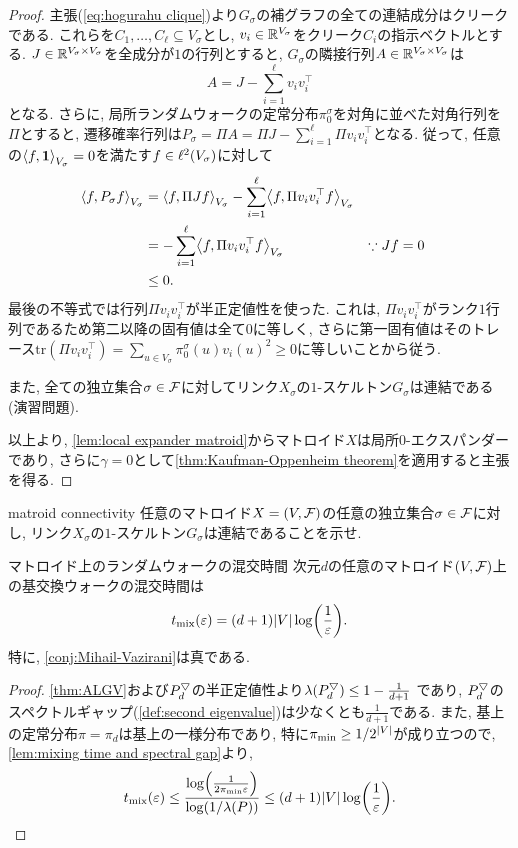 \begin{proof}
    主張(\ref{eq:hogurahu clique})より$G_\sigma$の補グラフの全ての連結成分はクリークである.
    これらを$C_1,\dots,C_\ell \subseteq V_\sigma$とし,
    $v_i\in \Real^{V_\sigma}$をクリーク$C_i$の指示ベクトルとする.
    $J\in\Real^{V_\sigma\times V_\sigma}$を全成分が$1$の行列とすると,
    $G_\sigma$の隣接行列$A\in\Real^{V_\sigma\times V_\sigma}$は
    \[
        A = J - \sum_{i=1}^\ell v_i v_i^\top
    \]
    となる.
    さらに, 局所ランダムウォークの定常分布$\pi^\sigma_0$を対角に並べた対角行列を$\Pi$とすると, 遷移確率行列は$P_\sigma = \Pi A = \Pi J - \sum_{i=1}^\ell \Pi v_iv_i^\top$となる.
    従って, 任意の$\iprod[V_\sigma]{f,\allone}=0$を満たす$f\in \ispace[V_\sigma]$に対して
    \begin{align*}
        \iprod[V_\sigma]{f,P_\sigma f} &= \iprod[V_\sigma]{f,\Pi J f} - \sum_{i=1}^\ell \iprod[V_\sigma]{f,\Pi v_iv_i^\top f} \\
        &= - \sum_{i=1}^\ell \iprod[V_\sigma]{f,\Pi v_iv_i^\top f} & & \text{$\because J f = 0$} \\
        &\le 0.
    \end{align*}
    最後の不等式では行列$\Pi v_iv_i^\top$が半正定値性を使った.
    これは,
    $\Pi v_i v_i^\top$がランク$1$行列であるため第二以降の固有値は全て$0$に等しく,
    さらに第一固有値はそのトレース$\mathrm{tr}(\Pi v_i v_i^\top) = \sum_{u\in V_\sigma} \pi^\sigma_0(u) v_i(u)^2\ge 0$に等しいことから従う.
    
    また, 全ての独立集合$\sigma\in \F$に対してリンク$X_\sigma$の$1$-スケルトン$G_\sigma$は連結である (演習問題).

    以上より, \cref{lem:local expander matroid}からマトロイド$X$は局所$0$-エクスパンダーであり, さらに$\gamma=0$として\cref{thm:Kaufman-Oppenheim theorem}を適用すると主張を得る.
\end{proof}

\begin{exercise}{}{matroid connectivity}
    任意のマトロイド$X = (V,\F)$の任意の独立集合$\sigma \in \F$に対し,
    リンク$X_\sigma$の$1$-スケルトン$G_\sigma$は連結であることを示せ.
\end{exercise}

\begin{corollary}{マトロイド上のランダムウォークの混交時間}{}
    次元$d$の任意のマトロイド$(V,\F)$上の基交換ウォークの混交時間は
    \[
        \tmix(\varepsilon) = (d+1)|V|\log\rbra*{\frac{1}{\varepsilon}}.
    \]
    特に, \cref{conj:Mihail-Vazirani}は真である.
\end{corollary}
\begin{proof}
    \cref{thm:ALGV}および$\PDU_d$の半正定値性より$\lambda(\PDU_d) \le 1-\frac{1}{d+1}$ であり, $\PDU_d$のスペクトルギャップ(\cref{def:second eigenvalue})は少なくとも$\frac{1}{d+1}$である.
    また, 基上の定常分布$\pi=\pi_d$は基上の一様分布であり, 特に$\pimin \ge 1/2^{|V|}$が成り立つので, \cref{lem:mixing time and spectral gap}より, 
    \[
        \tmix(\varepsilon) \le \frac{\log\rbra*{\frac{1}{2\pimin\varepsilon}}}{\log(1/\lambda(P))} \le (d+1)|V|\log\rbra*{\frac{1}{\varepsilon}}.
    \]
\end{proof}